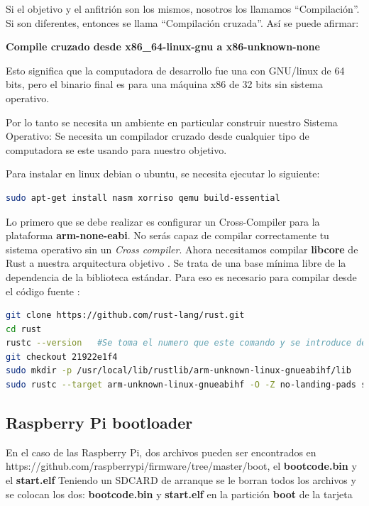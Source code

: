 \documentclass[12pt, twoside]{report}
\begin{document}
Si el objetivo y el anfitrión son los mismos, nosotros los llamamos ``Compilación''. Si son diferentes, entonces se llama ``Compilación cruzada''. Así se puede afirmar:


 \begin{flushright}
 \textbf{Compile cruzado desde x86\_64-linux-gnu a x86-unknown-none}
 \end{flushright}

Esto significa que la computadora de desarrollo fue una con GNU/linux de 64 bits, pero el binario final es para una máquina x86 de 32 bits sin sistema operativo.

Por lo tanto se necesita un ambiente en particular construir nuestro Sistema Operativo: Se necesita un compilador cruzado desde cualquier tipo de computadora se este usando para nuestro objetivo.

Para instalar en linux debian o ubuntu, se necesita ejecutar lo siguiente:

\begin{lstlisting}[language=bash]
sudo apt-get install nasm xorriso qemu build-essential
\end{lstlisting}

Lo primero que se debe realizar es configurar un Cross-Compiler para la plataforma \textbf{arm-none-eabi}. No serás capaz de compilar correctamente tu sistema operativo sin un \textit{Cross compiler}. Ahora necesitamos compilar \textbf{libcore} de Rust a nuestra arquitectura objetivo . Se trata de una base mínima libre de la dependencia de la biblioteca estándar. Para eso es necesario para compilar desde el código fuente :

\begin{lstlisting}[language=bash]
git clone https://github.com/rust-lang/rust.git
cd rust
rustc --version   #Se toma el numero que este comando y se introduce despues del comando checkout de la linea siguiente
git checkout 21922e1f4
sudo mkdir -p /usr/local/lib/rustlib/arm-unknown-linux-gnueabihf/lib 
sudo rustc --target arm-unknown-linux-gnueabihf -O -Z no-landing-pads src/libcore/lib.rs --out-dir /usr/local/lib/rustlib/arm-unknown-linux-gnueabihf/lib
\end{lstlisting}

\subsection{Raspberry Pi bootloader}

En el caso de las Raspberry Pi, dos archivos pueden ser encontrados en https://github.com/raspberrypi/firmware/tree/master/boot, el \textbf{bootcode.bin} y el \textbf{start.elf}
Teniendo un SDCARD de arranque se le borran todos los archivos y se colocan los dos:  \textbf{bootcode.bin} y \textbf{start.elf} en la partición \textbf{boot} de la tarjeta
\end{document}
